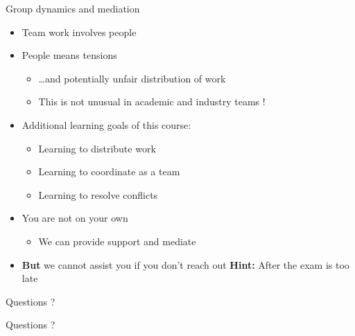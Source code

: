 \begin{frame}{Group dynamics and mediation}
    \begin{itemize}
        \item Team work involves people
        \item People means tensions
            \begin{itemize}
                \vspace{-0.3em}
                \item \ldots and potentially unfair distribution of work
                \vspace{-0.3em}
                \item This is not unusual in academic and industry teams !
            \end{itemize}
        \vspace{1.0em}
        \item Additional \alert{learning goals of this course}:
            \begin{itemize}
                \item Learning to distribute work
                \item Learning to coordinate as a team
                \item Learning to resolve conflicts
            \end{itemize}
        \vspace{1.0em}
            \item \alert{You are not on your own}
                \begin{itemize}
                \vspace{-0.3em}
                \item We can provide support and mediate
                \end{itemize}
            \vspace{0.5em}
            \item \textbf{But} we cannot assist you if you don't reach out
                \linebreak
                \textbf{Hint:}  After the exam is too late
    \end{itemize}
\end{frame}

\begin{frame}{Questions ?}
    \begin{center}
        \huge{Questions ?}
    \end{center}
\end{frame}
